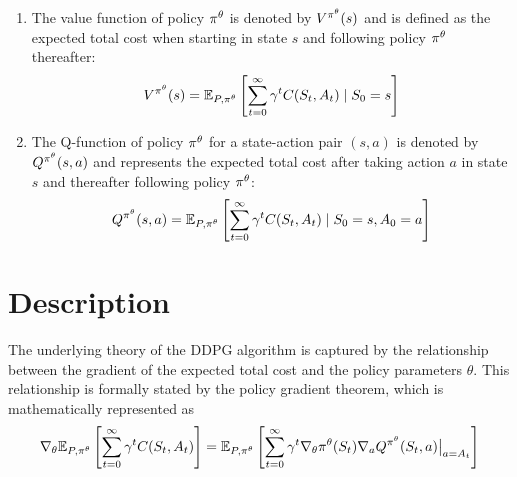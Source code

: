 \documentclass[12pt,twoside]{../../mitthesis}
\begin{document}
\begin{enumerate}
    \item The value function of policy $\policy^{\theta}$ is denoted by $V^{\policy^{\theta}}(s)$ and is defined as the expected total cost when starting in state $s$ and following policy $\policy^{\theta}$ thereafter:
    $$
    \Value^{\policy^{\theta}}(\state) =  \E[\transit, \policy^{\theta}]{\sum_{t = 0}^{\infty} \gamma ^ t \Cost(\State_{t}, \Action_{t}) \mid \State_0 = \state}
    $$ 
    \item The Q-function of policy $\policy^{\theta}$ for a state-action pair $(s, a)$ is denoted by $Q^{\policy^{\theta}}(s, a)$ and represents the expected total cost after taking action $a$ in state $s$ and thereafter following policy $\policy^{\theta}$: 
    $$
    Q^{\policy^{\theta}}(\state, \action) = \E[\transit, \policy^{\theta}]{\sum_{t = 0}^{\infty} \gamma ^ t \Cost(\State_{t}, \Action_{t}) \mid \State_0 = \state, \Action_0 = \action}
    $$
\end{enumerate}

\section*{Description}
The underlying theory of the DDPG algorithm is captured by the relationship between the gradient of the expected total cost and the policy parameters $\theta$. 
This relationship is formally stated by the policy gradient theorem, which is mathematically represented as
\begin{equation}
    \label{eqn_ddpg_grad}
    \nabla_{\theta} \E[\transit, \policy^{\theta}]{\sum_{t = 0}^{\infty} \gamma ^ t \Cost(\State_{t}, \Action_{t})} = 
    \E[\transit, \policy^{\theta}]{\sum_{t=0}^{\infty}\gamma^t\nabla_{\theta}\policy^{\theta}(\State_t)\nabla_{\action} Q^{\policy^{\theta}}(\State_t, \action)\big\rvert_{\action = \Action_t}}
\end{equation}
\end{document}
